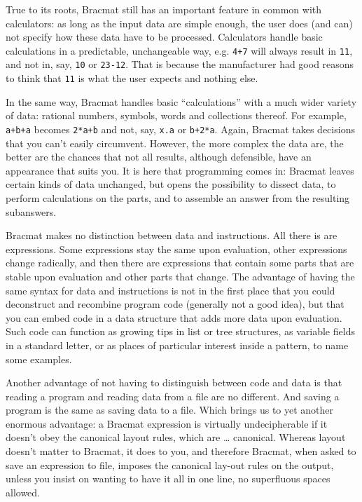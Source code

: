 \documentclass[12pt]{article}
\begin{document}
True to its roots, Bracmat still has an important feature in common
with calculators: as long as the input data are simple enough, the
user does (and can) not specify how these data have to be
processed. Calculators handle basic calculations in a predictable,
unchangeable way, e.g. \verb|4+7| will always result in \verb|11|, and
not in, say, \verb|10| or \verb|23-12|. That is because the
manufacturer had good reasons to think that \verb|11| is what the user
expects and nothing else.

In the same way, Bracmat handles basic ``calculations'' with a much
wider variety of data: rational numbers, symbols, words and
collections thereof. For example, \verb|a+b+a| becomes \verb|2*a+b|
and not, say, \verb|x.a| or \verb|b+2*a|. Again, Bracmat takes
decisions that you can't easily circumvent. However, the more complex
the data are, the better are the chances that not all results,
although defensible, have an appearance that suits you. It is here
that programming comes in: Bracmat leaves certain kinds of data
unchanged, but opens the possibility to dissect data, to perform
calculations on the parts, and to assemble an answer from the
resulting subanswers.

Bracmat makes no distinction between data and instructions. All there
is are expressions. Some expressions stay the same upon evaluation,
other expressions change radically, and then there are expressions
that contain some parts that are stable upon evaluation and other
parts that change. The advantage of having the same syntax for data
and instructions is not in the first place that you could deconstruct
and recombine program code (generally not a good idea), but that you
can embed code in a data structure that adds more data upon
evaluation. Such code can function as growing tips in list or tree
structures, as variable fields in a standard letter, or as places of
particular interest inside a pattern, to name some examples.

Another advantage of not having to distinguish between code and data
is that reading a program and reading data from a file are no
different. And saving a program is the same as saving data to a
file. Which brings us to yet another enormous advantage: a Bracmat
expression is virtually undecipherable if it doesn't obey the
canonical layout rules, which are \ldots{} canonical. Whereas layout
doesn't matter to Bracmat, it does to you, and therefore Bracmat, when
asked to save an expression to file, imposes the canonical lay-out
rules on the output, unless you insist on wanting to have it all in
one line, no superfluous spaces allowed.
\end{document}

